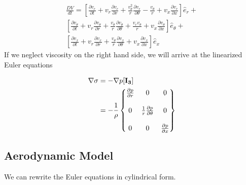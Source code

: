 \begin{align*}
\frac{DV}{dt} =
\left[ 
\frac{\partial v_r}{\partial t} + 
v_r \frac{\partial v_r}{\partial r}  +
\frac{v_{\theta}^2}{r}\frac{\partial v_r}{\partial \theta } -
\frac{v_{\theta}}{r} + v_x \frac{\partial v_r}{\partial x} 
\right] \hat{e}_r +\\
\left[ 
\frac{\partial v_\theta}{\partial t} + 
v_r \frac{\partial v_\theta}{\partial r}  +
\frac{v_{\theta}}{r}\frac{\partial v_{\theta}}{\partial \theta } +
\frac{v_r v_\theta}{r} +
v_x \frac{\partial v_{\theta}}{\partial x} 
\right] \hat{e}_{\theta} +\\
\left[ 
\frac{\partial v_x}{\partial t} + 
v_r \frac{\partial v_x}{\partial r}  +
\frac{v_{\theta}}{r}\frac{\partial v_x}{\partial \theta } + v_x \frac{\partial v_x}{\partial x} 
\right] \hat{e}_x
\end{align*}
If we neglect viscosity on the right hand side, we will arrive at the linearized Euler equations

\begin{align*}
\nabla \sigma &= -\nabla p [\bf{I_3}]\\
&=-\frac{1}{\rho}\begin{Bmatrix*}
\frac{\partial p}{\partial r} & 0 & 0\\
\\
0 & \frac{1}{r}\frac{\partial p}{\partial \theta} & 0\\
\\
0 & 0 &	\frac{\partial p}{\partial x} \\
\end{Bmatrix*}	
\end{align*}
\subsection{Aerodynamic Model}
We can rewrite the Euler equations in cylindrical form.

